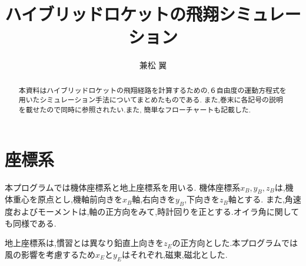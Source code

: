 \documentclass[a4paper]{jarticle}
\title{ハイブリッドロケットの飛翔シミュレーション}
\author{兼松 翼}
\begin{document}
\maketitle

\begin{abstract}
  本資料はハイブリッドロケットの飛翔経路を計算するための,６自由度の運動方程式を用いたシミュレーション手法についてまとめたものである.
  また,巻末に各記号の説明を載せたので同時に参照されたい.また, 簡単なフローチャートも記載した.
\end{abstract}


\section{座標系}

本プログラムでは機体座標系と地上座標系を用いる.
機体座標系\(x_B,y_B,z_B\)は,機体重心を原点とし,機軸前向きを\(x_B\)軸,右向きを\(y_B\),下向きを\(z_B\)軸とする.
また,角速度およびモーメントは,軸の正方向をみて,時計回りを正とする.オイラ角に関しても同様である.

地上座標系は,慣習とは異なり鉛直上向きを\(z_E\)の正方向とした.本プログラムでは風の影響を考慮するため\(x_E\)と\(y_E\)はそれぞれ,磁東,磁北とした.
\end{document}
